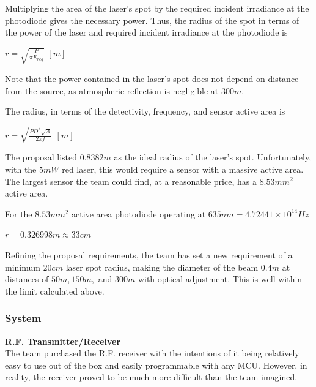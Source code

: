 \documentclass[letterpaper,10pt]{article}
\begin{document}
\begin{spacing}{1.15}
Multiplying the area of the laser's spot by the required incident irradiance at the photodiode gives the necessary power. Thus, the radius of the spot in terms of the power of the laser and required incident irradiance at the photodiode is 
\begin{center}
	{\large $r = \sqrt{\frac{P}{\pi E_{req}}}$} $[m]$
\end{center}

Note that the power contained in the laser's spot does not depend on distance from the source, as atmospheric reflection is negligible at $300 m$.

The radius, in terms of the detectivity, frequency, and sensor active area is
\begin{center}
	{\large $r = \sqrt{\frac{PD^*\sqrt{A}}{2 \pi f}}$} $[m]$
\end{center}

The proposal listed $0.8382 m$ as the ideal radius of the laser's spot. Unfortunately, with the $5mW$ red laser, this would require a sensor with a massive active area. The largest sensor the team could find, at a reasonable price, has a $8.53 mm^2$ active area. 

For the $8.53 mm^2$ active area photodiode operating at $635 nm = 4.72441 × 10^{14} Hz$ 
\begin{center}
	$r = 0.326998 m \approx 33 cm$
\end{center}

Refining the proposal requirements, the team has set a new requirement of a minimum $20 cm$ laser spot radius, making the diameter of the beam $0.4m$ at distances of $50m, 150m,$ and $300m$ with optical adjustment. This is well within the limit calculated above.  





\subsubsection{System}

\hspace{5mm}\textbf{R.F. Transmitter/Receiver} \label{section:rf-transmitter-design-procedure} \\


The team purchased the R.F. receiver with the intentions of it being relatively easy to use out of the box and easily programmable with any MCU. However, in reality, the receiver proved to be much more difficult than the team imagined. 


\end{spacing}
\end{document}
